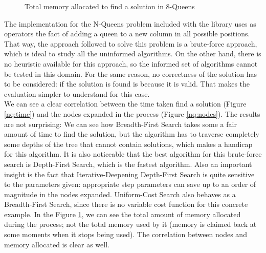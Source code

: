 \begin{figure}[!htbp]
  \centering
  \caption{Total memory allocated to find a solution in 8-Queens}
  \label{nq:memory}
\end{figure}

The implementation for the N-Queens problem included with the library uses as
operators the fact of adding a queen to a new column in all possible positions.
That way, the approach followed to solve this problem is a brute-force
approach, which is ideal to study all the uninformed algorithms. On the other
hand, there is no heuristic available for this approach, so the informed set of
algorithms cannot be tested in this domain. For the same reason, no correctness
of the solution has to be considered: if the solution is found is because it is
valid. That makes the evaluation simpler to understand for this case.\\

We can see a clear correlation between the time taken find a solution (Figure
\ref{nq:time}) and the nodes expanded in the process (Figure \ref{nq:nodes}).
The results are not surprising: We can see how Breadth-First Search takes some
a fair amount of time to find the solution, but the algorithm has to traverse
completely some depths of the tree that cannot contain solutions, which makes
a handicap for this algorithm. It is also noticeable that the best algorithm
for this brute-force search is Depth-First Search, which is the fastest
algorithm. Also an important insight is the fact that Iterative-Deepening
Depth-First Search is quite sensitive to the parameters given: appropriate step
parameters can save up to an order of magnitude in the nodes expanded.
Uniform-Cost Search also behaves as a Breadth-First Search, since there is no
variable cost function for this concrete example. In the Figure
\ref{nq:memory}, we can see the total amount of memory allocated during the
process; not the total memory used by it (memory is claimed back at some
moments when it stops being used). The correlation between nodes and memory
allocated is clear as well.\\


